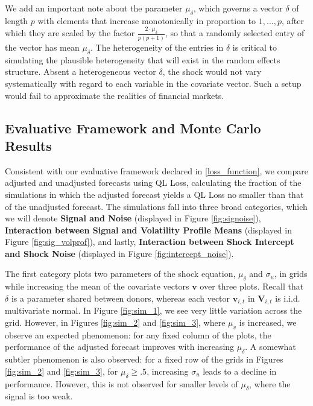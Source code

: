 \documentclass[11pt,3p,review,authoryear]{elsarticle}
\newcommand{\x}{\textbf{v}}
\newcommand{\V}{\textbf{V}}
\theoremstyle{definition}
\begin{document}
  We add an important note about the parameter $\mu_{\delta}$, which governs a vector $\delta$ of length $p$ with elements that increase monotonically in proportion to $1,...,p$, after which they are scaled by the factor $\frac{2\cdot\mu_{\delta}}{p(p+1)}$, so that a randomly selected entry of the vector has mean $\mu_{\delta}$.  The heterogeneity of the entries in $\delta$ is critical to simulating the plausible heterogeneity that will exist in the random effects structure.  Absent a heterogeneous vector $\delta$, the shock would not vary systematically with regard to each variable in the covariate vector.  Such a setup would fail to approximate the realities of financial markets.

\subsection{Evaluative Framework and Monte Carlo Results}
Consistent with our evaluative framework declared in \ref{loss_function}, we compare adjusted and unadjusted forecasts using QL Loss, calculating the fraction of the simulations in which the adjusted forecast yields a QL Loss no smaller than that of the unadjusted forecast.  The simulations fall into three broad categories, which we will denote \textbf{Signal and Noise} (displayed in Figure \ref{fig:signoise}), \textbf{Interaction between Signal and Volatility Profile Means} (displayed in Figure \ref{fig:sig_volprof}), and lastly, \textbf{Interaction between Shock Intercept and Shock Noise} (displayed in Figure \ref{fig:intercept_noise}).  

The first category plots two parameters of the shock equation, $\mu_{\delta}$ and $\sigma_{u}$, in grids while increasing the mean of the covariate vectors $\x$ over three plots.  Recall that $\delta$ is a parameter shared between donors, whereas each vector $\x_{i,t}$ in $\V_{i,t}$ is i.i.d. multivariate normal.  In Figure \ref{fig:sim_1}, we see very little variation across the grid.  However, in Figures \ref{fig:sim_2} and \ref{fig:sim_3}, where $\mu_{v}$ is increased, we observe an expected phenomenon: for any fixed column of the plots, the performance of the adjusted forecast improves with increasing $\mu_{\delta}$.  A somewhat subtler phenomenon is also observed: for a fixed row of the grids in Figures \ref{fig:sim_2} and \ref{fig:sim_3}, for $\mu_{\delta} \geq .5$, increasing $\sigma_{u}$ leads to a decline in performance.  However, this is not observed for smaller levels of $\mu_{\delta}$, where the signal is too weak.
\end{document}
